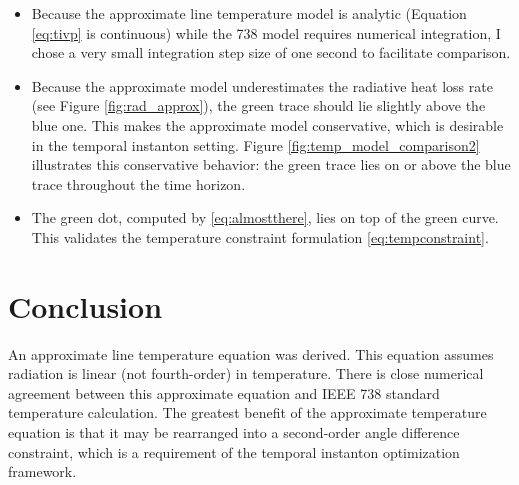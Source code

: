 \documentclass{article}
\begin{document}
\begin{itemize}
\item
  Because the approximate line temperature model is analytic (Equation \eqref{eq:tivp} is continuous) while the 738 model requires numerical integration, I chose
  a very small integration step size of one second to facilitate comparison.
\item
  Because the approximate model underestimates the radiative heat loss
  rate (see Figure \ref{fig:rad_approx}), the green trace should lie slightly above the blue one. This
  makes the approximate model conservative, which is desirable in the
  temporal instanton setting. Figure \ref{fig:temp_model_comparison2} illustrates this conservative behavior: the green trace lies on or above the blue trace throughout the time horizon.
  \item The green dot, computed by \eqref{eq:almostthere}, lies on top of the green curve. This validates the temperature constraint formulation \eqref{eq:tempconstraint}.
\end{itemize}

\section{Conclusion}

An approximate line temperature equation was derived. This equation assumes radiation is linear (not fourth-order) in temperature. There is close numerical agreement between this approximate equation and IEEE 738 standard temperature calculation. The greatest benefit of the approximate temperature equation is that it may be rearranged into a second-order angle difference constraint, which is a requirement of the temporal instanton optimization framework.
    
\end{document}
